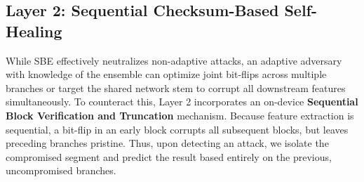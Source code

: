 \documentclass[conference]{IEEEtran}
\begin{document}
\subsection{Layer 2: Sequential Checksum-Based Self-Healing}
While SBE effectively neutralizes non-adaptive attacks, an adaptive adversary with knowledge of the ensemble can optimize joint bit-flips across multiple branches or target the shared network stem to corrupt all downstream features simultaneously. To counteract this, Layer 2 incorporates an on-device \textbf{Sequential Block Verification and Truncation} mechanism. Because feature extraction is sequential, a bit-flip in an early block corrupts all subsequent blocks, but leaves preceding branches pristine. Thus, upon detecting an attack, we isolate the compromised segment and predict the result based entirely on the previous, uncompromised branches.
\end{document}
